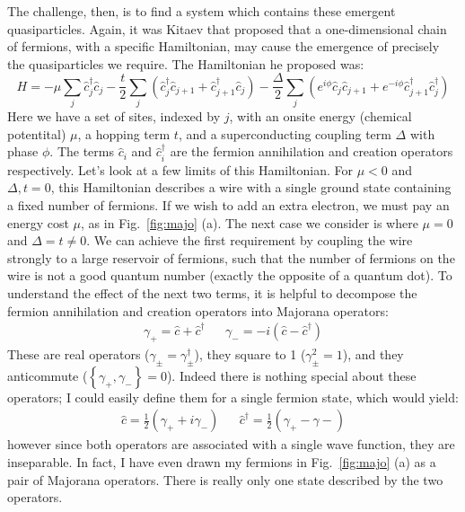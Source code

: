 The challenge, then, is to find a system which contains these emergent quasiparticles. Again, it was Kitaev that proposed that
a one-dimensional chain of fermions, with a specific Hamiltonian, may cause the emergence of precisely the quasiparticles we require\cite{Kitaev_2001}.
The Hamiltonian he proposed was\cite{Alicea_2012}:
\begin{equation}
  H = -\mu\sum_j \hat c_j^\dagger \hat c_j - \frac{t}{2}\sum_j\left(\hat c_j^\dagger \hat c_{j+1} + \hat c_{j+1}^\dagger \hat c_j\right)
      -\frac{\Delta}{2}\sum_j\left(e^{i\phi}\hat c_j\hat c_{j+1} + e^{-i\phi} \hat c_{j+1}^\dagger \hat c_j^\dagger\right)
  \label{eq:kith}
\end{equation}
Here we have a set of sites, indexed by $j$, with an onsite energy (chemical potentital) $\mu$, a hopping term $t$, and a superconducting coupling
term $\Delta$ with phase $\phi$. The terms $\hat c_i$ and $\hat c_i^\dagger$ are the fermion annihilation and creation operators respectively.
Let's look at a few limits of this Hamiltonian. For $\mu < 0$ and $\Delta, t = 0$, this Hamiltonian describes a wire with a single ground state containing a fixed
number of fermions. If we wish to add an extra electron, we must pay an energy cost $\mu$, as in Fig.~\ref{fig:majo} (a). The next case we consider is where $\mu=0$ and
$\Delta = t \neq 0$. We can achieve the first requirement by coupling the wire strongly to a large reservoir of fermions, such that the number of
fermions on the wire is not a good quantum number (exactly the opposite of a quantum dot). To understand the effect of the next two terms, it is
helpful to decompose the fermion annihilation and creation operators into Majorana operators:
\begin{align}
  \gamma_+ = \hat c + \hat c^\dagger && \gamma_- = -i(\hat c - \hat c^\dagger)
\end{align}
These are real operators ($\gamma_\pm = \gamma_\pm^\dagger$), they square to 1 ($\gamma_\pm^2 = 1$), and they anticommute ($\left\{\gamma_+, \gamma_-\right\} = 0$).
Indeed there is nothing special about these operators; I could easily define them for a single fermion state, which would yield:
\begin{align}
  \hat c = \frac{1}{2}(\gamma_{+} + i\gamma_{-}) && \hat c^\dagger = \frac{1}{2}(\gamma_{+} - \gamma{-})
\end{align}
however since both operators are associated with a single wave function, they are inseparable. In fact, I have even drawn my fermions in Fig.~\ref{fig:majo} (a) as a
pair of Majorana operators. There is really only one state described by the two operators.
